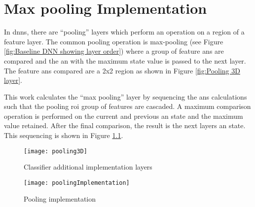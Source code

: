 

\chapter{Max pooling Implementation}
\label{sec:Appendix-B}
\label{sec:Max pooling}

In \acp{dnn}, there are ``pooling''\cite{stanford_pooling} layers which perform an operation on a region of a feature layer. 
The common pooling operation is max-pooling (see Figure \ref{fig:Baseline DNN showing layer order}) where a group of feature \acp{an} are compared and the \ac{an} with the maximum state value is passed to the next layer.
The feature \acp{an} compared are a 2x2 region as shown in Figure \ref{fig:Pooling 3D layer}.

This work calculates the ``max pooling'' layer by sequencing the \acp{an} calculations such that the pooling \ac{roi} group of features are cascaded.
A maximum comparison operation is performed on the current and previous \ac{an} state and the maximum value retained. After the final comparison, the result is the next layers \ac{an} state.
This sequencing is shown in Figure \ref{fig:Pooling implementation}.

\begin{figure}[h]
  \centering
  \captionsetup{justification=centering}
  \captionsetup{width=0.9\textwidth}
  \begin{minipage}{1\textwidth}
    \centering
    \centerline{
    \mbox{\texttt{[image: pooling3D]}}
    }
    \caption{Classifier additional implementation layers}
    \label{fig:Pooling 3D layer}
  \end{minipage}

  \bigskip
  \vspace{0.5cm}
  \begin{minipage}{1\textwidth}
    \centering
    \centerline{
    \mbox{\texttt{[image: poolingImplementation]}}
    }
    \caption{Pooling implementation}
    \label{fig:Pooling implementation}
  \end{minipage}
\end{figure}


